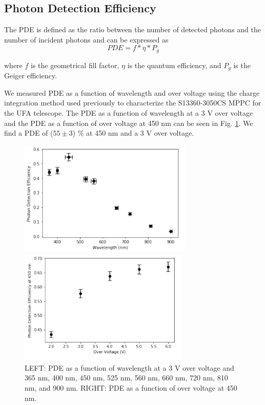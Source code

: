 \documentclass{article}
\begin{document}
\subsection{Photon Detection Efficiency}
The PDE is defined as the ratio between the number of detected photons and the number of incident photons
and can be expressed as
\begin{equation}
    PDE = f * \eta * P_g
\end{equation}

where $f$ is the geometrical fill factor, $\eta$ is the quantum efficiency, and $P_g$ is the Geiger efficiency.

We measured PDE as a function of wavelength and over voltage using the charge integration method used
previously to characterize the S13360-3050CS MPPC for the UFA telescope.\cite{li2019characterization} The PDE as a function of
wavelength at a 3 V over voltage and the PDE as a function of over voltage at 450 nm can be seen in Fig. \ref{fig:PDE}.
We find a PDE of ($55 \pm 3$) \% at 450 nm and a 3 V over voltage.

\begin{figure}[ht]

  \begin{minipage}[b]{0.49\textwidth}
    \centering     
    \includegraphics[height=5.5cm]{images/figura6.jpg}
  \end{minipage}
  \hfill
  \begin{minipage}[b]{0.49\textwidth}
    \centering     
    \includegraphics[height=5.5cm]{images/figura7.jpg}
  \end{minipage}
     
    \caption{LEFT: PDE as a function of wavelength at a 3 V over voltage and 365 nm, 400 nm, 450 nm, 525 nm, 560 nm,
    660 nm, 720 nm, 810 nm, and 900 nm. RIGHT: PDE as a function of over voltage at 450 nm.}
    \label{fig:PDE}
    
\end{figure}
\end{document}
